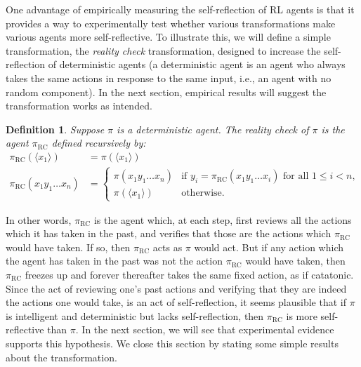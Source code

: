\documentclass{article}
\newtheorem{definition}[mytheorem]{Definition}
\def\RC{\textrm{RC}}
\begin{document}
One advantage of empirically measuring the self-reflection of RL agents is that it
provides a way to experimentally test whether various transformations make various
agents more self-reflective. To illustrate this, we will define a simple transformation,
the \emph{reality check} transformation, designed to increase the self-reflection
of deterministic agents (a deterministic agent is an agent who always takes the same
actions in response to the same input, i.e., an agent with no random component).
In the next section, empirical results will suggest the transformation works as intended.

\begin{definition}
\label{realitycheckdefn}
  Suppose $\pi$ is a deterministic agent. The \emph{reality check} of $\pi$ is the agent
  $\pi_{\RC}$ defined recursively by:
  \begin{align*}
    \pi_{\RC}(\langle x_1\rangle) &= \pi(\langle x_1\rangle)\\
    \pi_{\RC}(x_1y_1\ldots x_n) &=
    \begin{cases}
      \pi(x_1y_1\ldots x_n) & \mbox{if $y_i=\pi_{\RC}(x_1y_1\ldots x_i)$ for all $1\leq i<n$,}\\
      \pi(\langle x_1\rangle) & \mbox{otherwise.}
    \end{cases}
  \end{align*}
\end{definition}

In other words, $\pi_{\RC}$ is the agent which, at each step, first reviews all the actions
which it has taken in the past, and verifies that those are the actions which $\pi_{\RC}$ would
have taken. If so, then $\pi_{\RC}$ acts as $\pi$ would act. But if any action which
the agent has taken in the past was not the action $\pi_{\RC}$ would have taken, then
$\pi_{\RC}$ freezes up and forever thereafter takes the same fixed action, as if catatonic.
Since the act of reviewing one's past actions and verifying that they are indeed the actions
one would take, is an act of self-reflection, it seems plausible that if $\pi$
is intelligent and deterministic but lacks self-reflection, then $\pi_{\RC}$ is
more self-reflective than $\pi$. In the next section, we will see that experimental
evidence supports this hypothesis. We close this section by stating some simple results
about the transformation.
\end{document}
